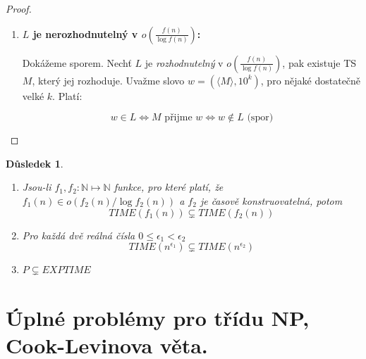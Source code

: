 \documentclass[11pt]{report} %
\newcommand{\N}{\mathbb{N}}
\newtheorem{implication}{Důsledek}[section]
\numberwithin{equation}{section}
\begin{document}
\begin{proof}
\begin{enumerate}
	\item \textbf{$L$ je nerozhodnutelný v $o(\frac{f(n)}{\log f(n)})$:}
	
	Dokážeme sporem. Nechť $L$ je \textit{rozhodnutelný} v $o(\frac{f(n)}{\log f(n)})$, pak existuje TS $M$, který jej rozhoduje. Uvažme slovo $w = (\langle M \rangle, 10^k)$, pro nějaké dostatečně velké $k$. Platí:
	
	$$w \in L \Leftrightarrow M \text{ přijme } w \Leftrightarrow w \notin L \text{ (spor)}$$

\end{enumerate}
\end{proof}

\begin{implication}~
	\begin{enumerate}
		\item Jsou-li $f_1, f_2 : \N \mapsto \N$ funkce, pro které platí, že $f_1(n) \in o(f_2(n)/ \log f_2(n))$ a $f_2$ je časově konstruovatelná, potom
			$$TIME(f_1(n)) \subsetneq TIME(f_2(n))$$
		\item Pro každá dvě reálná čísla $0 \leq \epsilon_1 < \epsilon_2$
			$$TIME(n^{\epsilon_1}) \subsetneq TIME(n^{\epsilon_2})$$
		\item $P \subsetneq EXPTIME$
	\end{enumerate}
\end{implication}









\section{Úplné problémy pro třídu NP, Cook-Levinova věta.}
\end{document}
